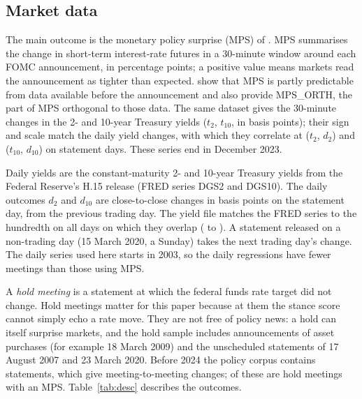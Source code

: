 \subsection{Market data}

The main outcome is the monetary policy surprise (MPS) of \citet{bauer2023reassessment}. MPS summarises
the change in short-term interest-rate futures in a 30-minute window around each FOMC announcement, in
percentage points; a positive value means markets read the announcement as tighter than expected.
\citet{bauer2023reassessment} show that MPS is partly predictable from data available before the
announcement and also provide MPS\_ORTH, the part of MPS orthogonal to those data. The same dataset
gives the 30-minute changes in the 2- and 10-year Treasury yields ($t_2$, $t_{10}$, in basis points);
their sign and scale match the daily yield changes, with which they correlate at 
($t_2$, $d_2$) and  ($t_{10}$, $d_{10}$) on statement days. These series end in
December 2023.

Daily yields are the constant-maturity 2- and 10-year Treasury yields from the Federal Reserve's H.15
release (FRED series DGS2 and DGS10). The daily outcomes $d_2$ and $d_{10}$ are close-to-close changes in
basis points on the statement day, from the previous trading day. The yield file matches the FRED series
to the hundredth on all  days on which they overlap ( to ). A
statement released on a non-trading day (15 March 2020, a Sunday) takes the next trading day's change.
The daily series used here starts in 2003, so the daily regressions have fewer meetings than those using
MPS.

A \emph{hold meeting} is a statement at which the federal funds rate target did not change. Hold meetings
matter for this paper because at them the stance score cannot simply echo a rate move. They are not free
of policy news: a hold can itself surprise markets, and the hold sample includes announcements of asset
purchases (for example 18 March 2009) and the unscheduled statements of 17 August 2007 and 23 March
2020. Before 2024 the policy
corpus contains  statements, which give  meeting-to-meeting changes;
 of these are hold meetings with an MPS. Table~\ref{tab:desc} describes the outcomes.

\begin{table}[t]
\centering
\caption{Market outcomes, policy corpus, statements to December 2023}\label{tab:desc}
\small

\end{table}

